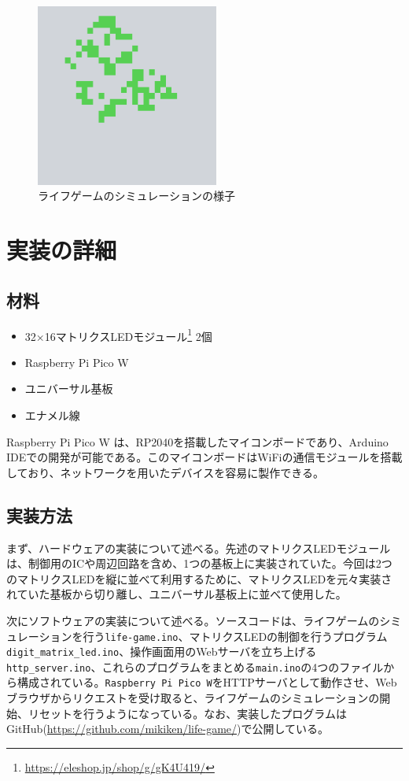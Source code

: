 \documentclass{jlreq}
\begin{document}
\begin{figure}[h]
    \begin{center}
        \includegraphics[width=60mm]{img/lifegame.png}
    \end{center}
    \caption{ライフゲームのシミュレーションの様子}
    \label{img:lifegame}
\end{figure}

\section{実装の詳細}
\subsection{材料}
\begin{itemize}
    \item 32×16マトリクスLEDモジュール\footnote{\url{https://eleshop.jp/shop/g/gK4U419/}} 2個
    \item Raspberry Pi Pico W
    \item ユニバーサル基板
    \item エナメル線
\end{itemize}
Raspberry Pi Pico W は、RP2040を搭載したマイコンボードであり、Arduino IDEでの開発が可能である。このマイコンボードはWiFiの通信モジュールを搭載しており、ネットワークを用いたデバイスを容易に製作できる。

\subsection{実装方法}
まず、ハードウェアの実装について述べる。先述のマトリクスLEDモジュールは、制御用のICや周辺回路を含め、1つの基板上に実装されていた。今回は2つのマトリクスLEDを縦に並べて利用するために、マトリクスLEDを元々実装されていた基板から切り離し、ユニバーサル基板上に並べて使用した。

次にソフトウェアの実装について述べる。ソースコードは、ライフゲームのシミュレーションを行う\verb|life-game.ino|、マトリクスLEDの制御を行うプログラム\verb|digit_matrix_led.ino|、操作画面用のWebサーバを立ち上げる\verb|http_server.ino|、これらのプログラムをまとめる\verb|main.ino|の4つのファイルから構成されている。\verb|Raspberry Pi Pico W|をHTTPサーバとして動作させ、Webブラウザからリクエストを受け取ると、ライフゲームのシミュレーションの開始、リセットを行うようになっている。なお、実装したプログラムはGitHub(\url{https://github.com/mikiken/life-game/})で公開している。
\end{document}
